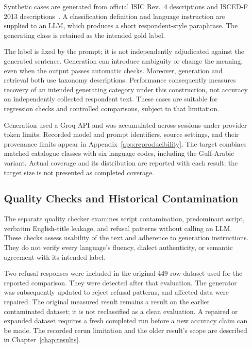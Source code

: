 Synthetic cases are generated from official ISIC Rev.~4 descriptions and
ISCED-F 2013 descriptions~\cite{unsd2008isic,unesco2015iscedf}. A
classification definition and language instruction are supplied to an LLM,
which produces a short respondent-style paraphrase. The generating class
is retained as the intended gold label.

The label is fixed by the prompt; it is not independently adjudicated
against the generated sentence. Generation can introduce ambiguity or
change the meaning, even when the output passes automatic checks.
Moreover, generation and retrieval both use taxonomy descriptions.
Performance consequently measures recovery of an intended generating
category under this construction, not accuracy on independently collected
respondent text. These cases are suitable for regression checks and
controlled comparisons, subject to that limitation.

Generation used a Groq API and was accumulated across sessions under
provider token limits. Recorded model and prompt identifiers, source settings,
and their provenance limits appear in Appendix~\ref{app:reproducibility}.
The target combines matched catalogue classes with
six language codes, including the Gulf-Arabic variant. Actual coverage and
its distribution are reported with each result; the target size is not
presented as completed coverage.

\subsection{Quality Checks and Historical Contamination}

The separate quality checker examines script contamination, predominant
script, verbatim English-title leakage, and refusal patterns without
calling an LLM. These checks assess usability of the text and adherence to
generation instructions. They do not verify every language's fluency,
dialect authenticity, or semantic agreement with its intended label.

Two refusal responses were included in the original 449-row dataset used
for the reported comparison. They were detected after that evaluation.
The generator was subsequently updated to reject refusal patterns, and
affected data were repaired. The original measured result remains a result
on the earlier contaminated dataset; it is not reclassified as a clean
evaluation. A repaired or expanded dataset requires a fresh completed
run before a new accuracy claim can be made. The recorded rerun limitation
and the older result's scope are described in Chapter~\ref{chap:results}.

